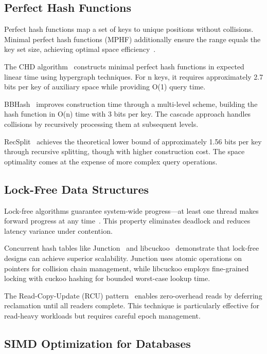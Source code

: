 \documentclass[10pt,conference]{IEEEtran}
\begin{document}
\subsection{Perfect Hash Functions}

Perfect hash functions map a set of keys to unique positions without collisions. Minimal perfect hash functions (MPHF) additionally ensure the range equals the key set size, achieving optimal space efficiency~\cite{mphf-survey}.

The CHD algorithm~\cite{chd-algorithm} constructs minimal perfect hash functions in expected linear time using hypergraph techniques. For n keys, it requires approximately 2.7 bits per key of auxiliary space while providing O(1) query time.

BBHash~\cite{bbhash} improves construction time through a multi-level scheme, building the hash function in O(n) time with 3 bits per key. The cascade approach handles collisions by recursively processing them at subsequent levels.

RecSplit~\cite{recsplit} achieves the theoretical lower bound of approximately 1.56 bits per key through recursive splitting, though with higher construction cost. The space optimality comes at the expense of more complex query operations.

\subsection{Lock-Free Data Structures}

Lock-free algorithms guarantee system-wide progress—at least one thread makes forward progress at any time~\cite{lock-free-survey}. This property eliminates deadlock and reduces latency variance under contention.

Concurrent hash tables like Junction~\cite{junction} and libcuckoo~\cite{libcuckoo} demonstrate that lock-free designs can achieve superior scalability. Junction uses atomic operations on pointers for collision chain management, while libcuckoo employs fine-grained locking with cuckoo hashing for bounded worst-case lookup time.

The Read-Copy-Update (RCU) pattern~\cite{rcu} enables zero-overhead reads by deferring reclamation until all readers complete. This technique is particularly effective for read-heavy workloads but requires careful epoch management.

\subsection{SIMD Optimization for Databases}
\end{document}
